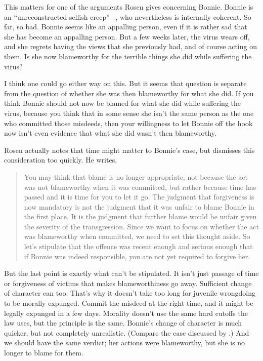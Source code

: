 This matters for one of the arguments Rosen gives concerning \gls{Bonnie}. \gls{Bonnie} is an ``unreconstructed selfish creep'' ~\citep[77]{Rosen2003}, who nevertheless is internally coherent. So far, so bad. \gls{Bonnie} seems like an appalling person, even if it is rather sad that she has become an appalling person. But a few weeks later, the virus wears off, and she regrets having the views that she previously had, and of course acting on them. Is she now blameworthy for the terrible things she did while suffering the virus?

I think one could go either way on this. But it seems that question is separate from the question of whether she was then blameworthy for what she did. If you think \gls{Bonnie} should not now be blamed for what she did while suffering the virus, because you think that in some sense she isn't the same person as the one who committed those misdeeds, then your willingness to let \gls{Bonnie} off the hook now isn't even evidence that what she did wasn't then blameworthy.

Rosen actually notes that time might matter to \gls{Bonnie}'s case, but dismisses this consideration too quickly. He writes,

\begin{quote}
You may think that blame is no longer appropriate, not because the act was not blameworthy when it was committed, but rather because time has passed and it is time for you to let it go. The judgment that forgiveness is now mandatory is not the judgment that it was unfair to blame \gls{Bonnie} in the first place. It is the judgment that further blame would be unfair given the severity of the transgression. Since we want to focus on whether the act was blameworthy when committed, we need to set this thought aside. So let's stipulate that the offence was recent enough and serious enough that if \gls{Bonnie} was indeed responsible, you are not yet required to forgive her. ~\citep[81]{Rosen2003}
\end{quote}
But the last point is exactly what can't be stipulated. It isn't just passage of time or forgiveness of victims that makes blameworthiness go away. Sufficient change of character can too. That's why it doesn't take too long for juvenile wrongdoing to be morally expunged. Commit the misdeed at the right time, and it might be legally expunged in a few days. Morality doesn't use the same hard cutoffs the law uses, but the principle is the same. \gls{Bonnie}'s change of character is much quicker, but not completely unrealistic. (Compare the case discussed by \citet{BurnsSwedlow2003}.) And we should have the same verdict; her actions were blameworthy, but she is no longer to blame for them.

